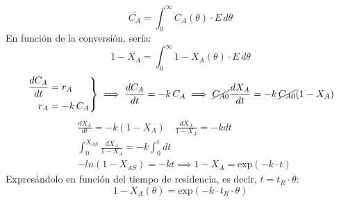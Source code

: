 \begin{equation*}
	\overline{C_A} = \int_{0}^{\infty} C_A(\theta) \cdot E \, d\theta
\end{equation*}
\noindent En función de la conversión, sería:
\begin{equation*}
	1 -\overline{X_A} = \int_{0}^{\infty} 1 - X_A(\theta) \cdot E \, d\theta
\end{equation*}
\begin{align*}
	\left.\begin{aligned}
		      \frac{dC_A}{dt} & = r_A     \\
		      r_A             & = -k\,C_A
	      \end{aligned}\right\}
	\implies \frac{dC_A}{dt} = -k\,C_A
	\implies \cancel{C_{A0}}\frac{dX_A}{dt} = -k\,\cancel{C_{A0}}(1-X_A)
\end{align*}
\begin{align*}
	 & \frac{dX_A}{dt}                       = -k(1-X_A)\quad \frac{dX_A}{1-X_A} = -k dt  \\[6pt]
	 & \int_{0}^{X_{AS}} \frac{dX_A}{1-X_A}  = -k \int_{0}^{t} dt                         \\[6pt]
	 & -ln(1-X_{AS})                         = -kt \implies 1-X_A = \text{exp}(-k\cdot t)
\end{align*}
\noindent Expresándolo en función del tiempo de residencia, es decir, $t = t_R \cdot \theta$:
\begin{equation*}
	\boxed{1-X_A(\theta) = \text{exp}(-k\cdot t_R \cdot \theta)}
\end{equation*}


